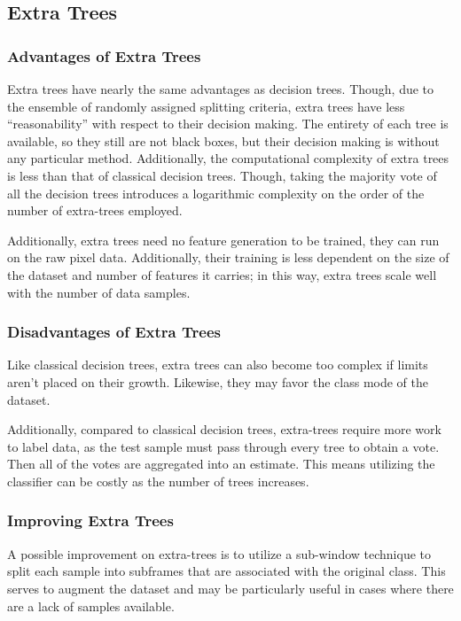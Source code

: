\subsection{Extra Trees}
\subsubsection{Advantages of Extra Trees}

Extra trees have nearly the same advantages as decision trees. Though, due to the ensemble of randomly assigned splitting criteria, extra trees have less ``reasonability'' with respect to their decision making. The entirety of each tree is available, so they still are not black boxes, but their decision making is without any particular method. Additionally, the computational complexity of extra trees is less than that of classical decision trees. Though, taking the majority vote of all the decision trees introduces a logarithmic complexity on the order of the number of extra-trees employed. 

Additionally, extra trees need no feature generation to be trained, they can run on the raw pixel data. Additionally, their training is less dependent on the size of the dataset and number of features it carries; in this way, extra trees scale well with the number of data samples.

\subsubsection{Disadvantages of Extra Trees}

Like classical decision trees, extra trees can also become too complex if limits aren't placed on their growth. Likewise, they may favor the class mode of the dataset. 

Additionally, compared to classical decision trees, extra-trees require more work to label data, as the test sample must pass through every tree to obtain a vote. Then all of the votes are aggregated into an estimate. This means utilizing the classifier can be costly as the number of trees increases.

\subsubsection{Improving Extra Trees}

A possible improvement on extra-trees is to utilize a sub-window technique to split each sample into subframes that are associated with the original class. This serves to augment the dataset and may be particularly useful in cases where there are a lack of samples available. 

